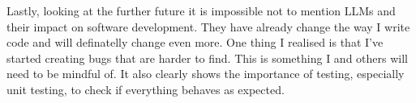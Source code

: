 \documentclass[11pt,a4paper]{article}
\begin{document}
Lastly, looking at the further future it is impossible not to mention LLMs and their impact on software development. They have already change the way I write code and will definatelly change even more. One thing I realised is that I've started creating bugs that are harder to find. This is something I and others will need to be mindful of. It also clearly shows the importance of testing, especially unit testing, to check if everything behaves as expected.

\printbibliography
\end{document}
